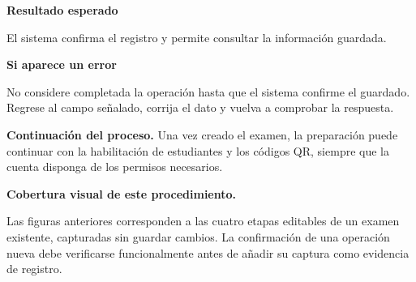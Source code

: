 \noindent\textbf{Resultado esperado}

El sistema confirma el registro y permite
consultar la información guardada.

\noindent\textbf{Si aparece un error}

No considere completada la operación
hasta que el sistema confirme el guardado.
Regrese al campo señalado, corrija el dato
y vuelva a comprobar la respuesta.

\medskip
\noindent
{\color{Teal}\bfseries Continuación del proceso.}
Una vez creado el examen, la preparación
puede continuar con la habilitación de
estudiantes y los códigos QR, siempre que
la cuenta disponga de los permisos necesarios.

\begin{notebox}
\textbf{Cobertura visual de este procedimiento.}

Las figuras anteriores corresponden a
las cuatro etapas editables de un examen
existente, capturadas sin guardar cambios.
La confirmación de una operación nueva
debe verificarse funcionalmente antes de
añadir su captura como evidencia de registro.
\end{notebox}

